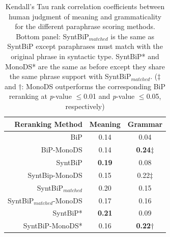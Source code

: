 \documentclass[11pt]{article}
\begin{document}
\begin{table}%
\begin{center}
\begin{tabular}{rcc}%
\hline\hline \bf \footnotesize Reranking Method & \bf \footnotesize Meaning & \bf \footnotesize Grammar \\ \hline
{\scriptsize BiP} & {\scriptsize 0.14} & {\scriptsize 0.04} \\
{\scriptsize BiP-MonoDS} & {\scriptsize 0.14} & {\scriptsize \bf 0.24$\ddagger$} \\
{\scriptsize SyntBiP} & {\scriptsize \bf 0.19}& {\scriptsize 0.08} \\
{\scriptsize SyntBip-MonoDS} & {\scriptsize 0.15} & {\scriptsize 0.22$\ddagger$} \\
\hline 
{\scriptsize SyntBiP$_{matched}$} &  {\scriptsize 0.20} & {\scriptsize 0.15} \\
{\scriptsize SyntBiP$_{matched}$-MonoDS}&  {\scriptsize 0.17} & {\scriptsize 0.16} \\
{\scriptsize SyntBiP*} &  {\scriptsize \bf 0.21} & {\scriptsize 0.09} \\
{\scriptsize SyntBiP-MonoDS*}&  {\scriptsize 0.16} & {\scriptsize \bf 0.22$\dagger$} \\
\hline
\end{tabular}
\end{center}
\caption{Kendall's Tau rank correlation coefficients between human judgment of meaning and grammaticality for the different paraphrase scoring methods. Bottom panel: SyntBiP$_{matched}$ is the same as SyntBiP except paraphrases must match with the original phrase in syntactic type. SyntBiP* and MonoDS* are the same as before except they share the same phrase support with SyntBiP$_{matched}$. ($\ddagger$ and $\dagger$: MonoDS outperforms the corresponding BiP reranking at \emph{p}-value $\le$0.01 and \emph{p}-value $\le$0.05, respectively)}
\label{tbl:table4} 
\end{table}
%
%
\end{document}
